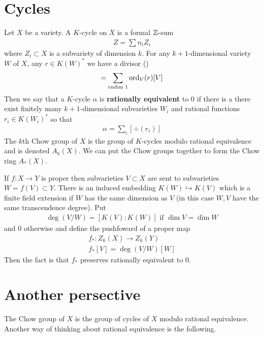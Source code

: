 \documentclass[12pt]{article}
\begin{document}
\section{Cycles}
Let $X$ be a variety. A $K$-cycle on $X$ is a formal $\mathbb{Z}$-sum \begin{align*}
    Z = \sum n_i Z_i
\end{align*} where $Z_i\subset X$ is a subvariety of dimension $k$. For any $k+1$-dimensional 
variety $W$ of $X$, any $r\in K(W)^*$ we have a divisor () \begin{align*}
    [\div(r)] = \sum_{\text{codim }1} \ord_V(r) [V]
\end{align*} Then we say that a $K$-cycle $\alpha$ is \textbf{rationally equivalent} to $0$ if there is a
there exist finitely many $k+1$-dimensional subvarieties $W_i$ and rational functions $r_i\in K(W_i)^*$ so that
\begin{align*}
    \alpha = \sum_i [\div(r_i)]
\end{align*}
The $k$th Chow group of $X$ is the group of $K$-cycles modulo rational equivalence and 
is denoted $A_k(X)$. We can put the Chow groups together to form the Chow ring $A_*(X)$.

\hfill


\hfill

If $f:X\to Y$ is proper then subvarieties $V\subset X$ are sent to subvarieties $W = f(V)\subset Y$.
There is an induced embedding $K(W)\hookrightarrow K(V)$ which is a finite field extension if $W$ has the same 
dimension as $V$ (in this case $W,V$ have the same transcendence degree). Put \begin{align*}
    \deg(V/W) = [K(V):K(W)] \text{ if } \dim V = \dim W
\end{align*} and $0$ otherwise and define the pushfoward of a proper map \begin{align*}
    f_*:Z_k(X)\to Z_k(Y) \\
    f_*[V] = \deg(V/W)[W]
\end{align*}
Then the fact is that $f_*$ preserves rationally equivalent to $0$.

\section{Another persective}
The Chow group of $X$ is the group of cycles of $X$ modulo rational equivalence. Another way of thinking about 
rational equivalence is the following.
\end{document}
